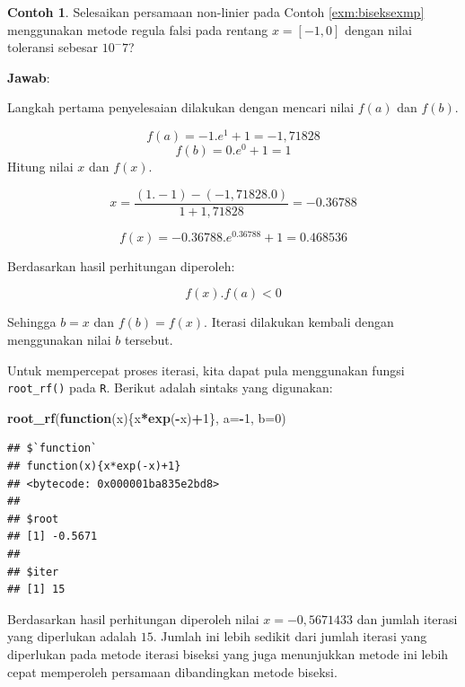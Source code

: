 \documentclass[
]{book}
\newenvironment{Shaded}{\begin{snugshade}}{\end{snugshade}}
\newcommand{\AttributeTok}[1]{\textcolor[rgb]{0.13,0.29,0.53}{#1}}
\newcommand{\ControlFlowTok}[1]{\textcolor[rgb]{0.13,0.29,0.53}{\textbf{#1}}}
\newcommand{\DecValTok}[1]{\textcolor[rgb]{0.00,0.00,0.81}{#1}}
\newcommand{\FunctionTok}[1]{\textcolor[rgb]{0.13,0.29,0.53}{\textbf{#1}}}
\newcommand{\NormalTok}[1]{#1}
\newcommand{\SpecialCharTok}[1]{\textcolor[rgb]{0.81,0.36,0.00}{\textbf{#1}}}
\theoremstyle{definition}
\theoremstyle{definition}
\newtheorem{example}{Contoh}[chapter]
\theoremstyle{definition}
\theoremstyle{definition}
\theoremstyle{remark}
\begin{document}
\begin{example}
\protect\hypertarget{exm:rfexmp}{}\label{exm:rfexmp}Selesaikan persamaan non-linier pada Contoh \ref{exm:biseksexmp} menggunakan metode regula falsi pada rentang \(x=\left[-1,0 \right]\) dengan nilai toleransi sebesar \(10^-7\)?
\end{example}

\textbf{Jawab}:

Langkah pertama penyelesaian dilakukan dengan mencari nilai \(f\left(a \right)\) dan \(f\left(b \right)\).

\[
f\left(a \right)=-1.e^{1}+1=-1,71828
\]
\[
f\left(b \right)=0.e^{0}+1=1
\]
Hitung nilai \(x\) dan \(f\left(x \right)\).

\[
x=\frac{\left(1.-1\right)-\left(-1,71828.0\right)}{1+1,71828}=-0.36788
\]

\[
f\left(x \right)=-0.36788.e^{0.36788}+1=0.468536
\]

Berdasarkan hasil perhitungan diperoleh:

\[
f\left(x \right).f\left(a \right)<0
\]

Sehingga \(b=x\) dan \(f\left(b \right)=f\left(x \right)\). Iterasi dilakukan kembali dengan menggunakan nilai \(b\) tersebut.

Untuk mempercepat proses iterasi, kita dapat pula menggunakan fungsi \texttt{root\_rf()} pada \texttt{R}. Berikut adalah sintaks yang digunakan:

\begin{Shaded}
\begin{Highlighting}[]
\FunctionTok{root\_rf}\NormalTok{(}\ControlFlowTok{function}\NormalTok{(x)\{x}\SpecialCharTok{*}\FunctionTok{exp}\NormalTok{(}\SpecialCharTok{{-}}\NormalTok{x)}\SpecialCharTok{+}\DecValTok{1}\NormalTok{\},}
               \AttributeTok{a=}\SpecialCharTok{{-}}\DecValTok{1}\NormalTok{, }\AttributeTok{b=}\DecValTok{0}\NormalTok{)}
\end{Highlighting}
\end{Shaded}

\begin{verbatim}
## $`function`
## function(x){x*exp(-x)+1}
## <bytecode: 0x000001ba835e2bd8>
## 
## $root
## [1] -0.5671
## 
## $iter
## [1] 15
\end{verbatim}

Berdasarkan hasil perhitungan diperoleh nilai \(x=-0,5671433\) dan jumlah iterasi yang diperlukan adalah \(15\). Jumlah ini lebih sedikit dari jumlah iterasi yang diperlukan pada metode iterasi biseksi yang juga menunjukkan metode ini lebih cepat memperoleh persamaan dibandingkan metode biseksi.
\end{document}
